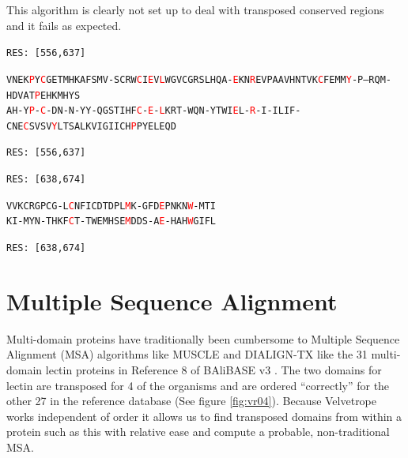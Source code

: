 \documentclass[phd,tocprelim]{cornell}
\begin{document}
This algorithm is clearly not set up to deal with transposed conserved regions and it fails as expected.

\begin{flushleft}
\singlespacing
\footnotesize
 
\texttt{RES: [556,637]}

\texttt{VNEK\textcolor{red}{P}Y\textcolor{red}{C}GETMHKAFSMV-SCRW\textcolor{red}{C}I\textcolor{red}{E}V\textcolor{red}{L}WGVCGRSLHQA-\textcolor{red}{E}KN\textcolor{red}{R}EVPAAVHNTVK\textcolor{red}{C}FEMM\textcolor{red}{Y}-P--RQM-HDVAT\textcolor{red}{P}EHKMHYS} \\
\texttt{AH-Y\textcolor{red}{P}-\textcolor{red}{C}-DN-N-YY-QGSTIHF\textcolor{red}{C}-\textcolor{red}{E}-\textcolor{red}{L}KRT-WQN-YTWI\textcolor{red}{E}L-\textcolor{red}{R}-I-ILIF-CNE\textcolor{red}{C}SVSV\textcolor{red}{Y}LTSALKVIGIICH\textcolor{red}{P}PYELEQD}

\texttt{RES: [556,637]}

\texttt{RES: [638,674]}

\texttt{VVKCRGPCG-L\textcolor{red}{C}NFICDTDPL\textcolor{red}{M}K-GFD\textcolor{red}{E}PNKN\textcolor{red}{W}-MTI} \\
\texttt{KI-MYN-THKF\textcolor{red}{C}T-TWEMHSE\textcolor{red}{M}DDS-A\textcolor{red}{E}-HAH\textcolor{red}{W}GIFL}

\texttt{RES: [638,674]}

\normalsize
\normalspacing
\end{flushleft}

\section{Multiple Sequence Alignment}

Multi-domain proteins have traditionally been cumbersome to Multiple Sequence Alignment (MSA) algorithms like MUSCLE \cite{MUSCLE} and DIALIGN-TX \cite{DIALIGN-TX} like the 31 multi-domain lectin proteins in Reference 8 of BAliBASE v3 \cite{Balibase}. The two domains for lectin are transposed for 4 of the organisms and are ordered ``correctly'' for the other 27 in the reference database (See figure \ref{fig:vr04}). Because Velvetrope works independent of order it allows us to find transposed domains from within a protein such as this with relative ease and compute a probable, non-traditional MSA.
\end{document}
